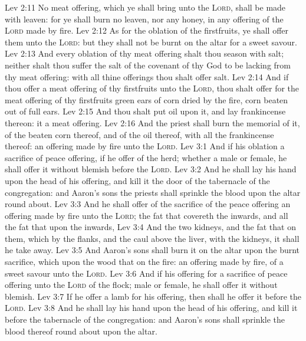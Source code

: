\vs Lev 2:11 No meat offering, which ye shall bring unto the \textsc{Lord}, shall be made with leaven: for ye shall burn no leaven, nor any honey, in any offering of the \textsc{Lord} made by fire.
\vs Lev 2:12 As for the oblation of the firstfruits, ye shall offer them unto the \textsc{Lord}: but they shall not be burnt on the altar for a sweet savour.
\vs Lev 2:13 And every oblation of thy meat offering shalt thou season with salt; neither shalt thou suffer the salt of the covenant of thy God to be lacking from thy meat offering: with all thine offerings thou shalt offer salt.
\vs Lev 2:14 And if thou offer a meat offering of thy firstfruits unto the \textsc{Lord}, thou shalt offer for the meat offering of thy firstfruits green ears of corn dried by the fire,  corn beaten out of full ears.
\vs Lev 2:15 And thou shalt put oil upon it, and lay frankincense thereon: it  a meat offering.
\vs Lev 2:16 And the priest shall burn the memorial of it,  of the beaten corn thereof, and  of the oil thereof, with all the frankincense thereof:  an offering made by fire unto the \textsc{Lord}.
\vs Lev 3:1 And if his oblation  a sacrifice of peace offering, if he offer  of the herd; whether  a male or female, he shall offer it without blemish before the \textsc{Lord}.
\vs Lev 3:2 And he shall lay his hand upon the head of his offering, and kill it  the door of the tabernacle of the congregation: and Aaron's sons the priests shall sprinkle the blood upon the altar round about.
\vs Lev 3:3 And he shall offer of the sacrifice of the peace offering an offering made by fire unto the \textsc{Lord}; the fat that covereth the inwards, and all the fat that  upon the inwards,
\vs Lev 3:4 And the two kidneys, and the fat that  on them, which  by the flanks, and the caul above the liver, with the kidneys, it shall he take away.
\vs Lev 3:5 And Aaron's sons shall burn it on the altar upon the burnt sacrifice, which  upon the wood that  on the fire:  an offering made by fire, of a sweet savour unto the \textsc{Lord}.
\vs Lev 3:6 And if his offering for a sacrifice of peace offering unto the \textsc{Lord}  of the flock; male or female, he shall offer it without blemish.
\vs Lev 3:7 If he offer a lamb for his offering, then shall he offer it before the \textsc{Lord}.
\vs Lev 3:8 And he shall lay his hand upon the head of his offering, and kill it before the tabernacle of the congregation: and Aaron's sons shall sprinkle the blood thereof round about upon the altar.
